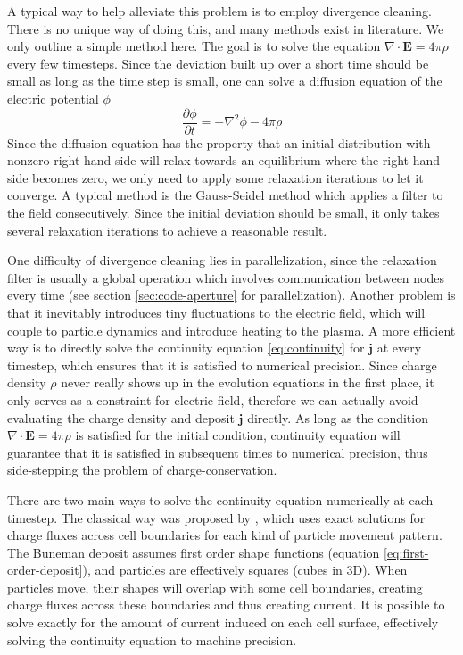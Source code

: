 A typical way to help alleviate this problem is to employ divergence
cleaning. There is no unique way of doing this, and many methods exist in
literature.  %
We only outline a simple method here. The goal is to solve the equation
$\nabla\cdot \mathbf{E} = 4\pi\rho$ every few timesteps. Since the deviation
built up over a short time should be small as long as the time step is small,
one can solve a diffusion equation of the electric potential $\phi$
\begin{equation}
  \label{eq:diffusion-electric-potential}
  \frac{\partial\phi}{\partial t} = -\nabla^2\phi - 4\pi\rho
\end{equation}
Since the diffusion equation has the property that an initial distribution with
nonzero right hand side will relax towards an equilibrium where the right hand
side becomes zero, we only need to apply some relaxation iterations to let it
converge. A typical method is the Gauss-Seidel method \citep[see
e.g.][]{press_numerical_2007} which applies a filter to the field consecutively.
Since the initial deviation should be small, it only takes several relaxation
iterations to achieve a reasonable result.

One difficulty of divergence cleaning lies in parallelization, since the
relaxation filter is usually a global operation which involves communication
between nodes every time (see section \ref{sec:code-aperture} for
parallelization). Another problem is that it inevitably introduces tiny
fluctuations to the electric field, which will couple to particle dynamics and
introduce heating to the plasma. A more efficient way is to directly solve the
continuity equation \eqref{eq:continuity} for $\mathbf{j}$ at every timestep,
which ensures that it is satisfied to numerical precision. Since charge density
$\rho$ never really shows up in the evolution equations in the first place, it
only serves as a constraint for electric field, therefore we can actually avoid
evaluating the charge density and deposit $\mathbf{j}$ directly. As long as the
condition $\nabla\cdot \mathbf{E} = 4\pi\rho$ is satisfied for the initial
condition, continuity equation will guarantee that it is satisfied in
subsequent times to numerical precision, thus side-stepping the problem of
charge-conservation.

There are two main ways to solve the continuity equation numerically at each
timestep. The classical way was proposed by \citet{villasenor_rigorous_1992},
which uses exact solutions for charge fluxes across cell boundaries for each
kind of particle movement pattern. The Buneman deposit assumes first order shape
functions (equation \eqref{eq:first-order-deposit}), and particles are effectively
squares (cubes in 3D). When particles move, their shapes will overlap with some
cell boundaries, creating charge fluxes across these boundaries and thus
creating current. It is possible to solve exactly for the amount of current
induced on each cell surface, effectively solving the continuity equation to
machine precision.

